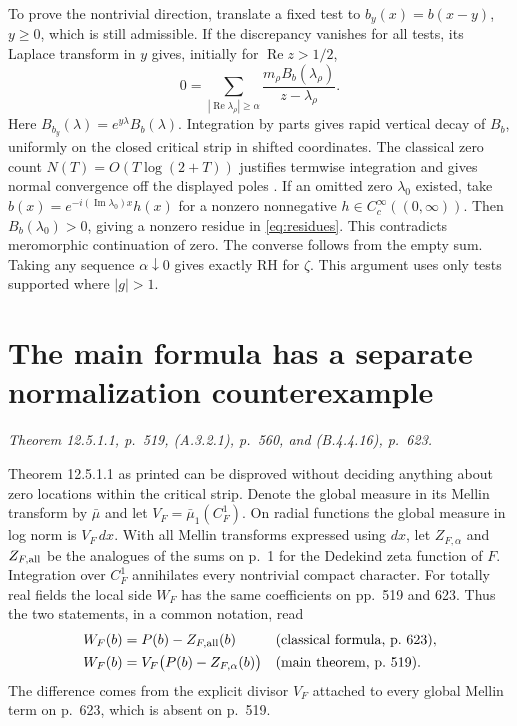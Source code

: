 \documentclass[11pt,letterpaper]{article}
\newcommand{\Rea}{\operatorname{Re}}
\newcommand{\Ima}{\operatorname{Im}}
\newcommand{\source}[1]{{\small\itshape #1}\par}
\newcommand{\pagepart}[2]{\clearpage\section{#1}\label{#2}}
\begin{document}
To prove the nontrivial direction, translate a fixed test to \(b_y(x)=b(x-y)\), \(y\ge0\), which is still admissible. If the discrepancy vanishes for all tests, its Laplace transform in \(y\) gives, initially for \(\Rea z>1/2\),
\begin{equation}
        0=\sum_{|\Rea\lambda_\rho|\ge\alpha}
                 \frac{m_\rho B_b(\lambda_\rho)}{z-\lambda_\rho}.
        \label{eq:residues}
\end{equation}
Here \(B_{b_y}(\lambda)=e^{y\lambda}B_b(\lambda)\). Integration by parts gives rapid vertical decay of \(B_b\), uniformly on the closed critical strip in shifted coordinates. The classical zero count \(N(T)=O(T\log(2+T))\) justifies termwise integration and gives normal convergence off the displayed poles \cite{bombieri}. If an omitted zero \(\lambda_0\) existed, take \(b(x)=e^{-i(\Ima\lambda_0)x}h(x)\) for a nonzero nonnegative \(h\in C_c^\infty((0,\infty))\). Then \(B_b(\lambda_0)>0\), giving a nonzero residue in \eqref{eq:residues}. This contradicts meromorphic continuation of zero. The converse follows from the empty sum. Taking any sequence \(\alpha\downarrow0\) gives exactly RH for \(\zeta\). This argument uses only tests supported where \(|g|>1\).

\pagepart{The main formula has a separate normalization counterexample}{sec:volume}
\source{Theorem 12.5.1.1, p.~519, (A.3.2.1), p.~560, and (B.4.4.16), p.~623.}

Theorem 12.5.1.1 as printed can be disproved without deciding anything about zero locations within the critical strip. Denote the global measure in its Mellin transform by \(\bar\mu\) and let \(V_F=\bar\mu_1(C_F^1)\). On radial functions the global measure in log norm is \(V_F\,dx\). With all Mellin transforms expressed using \(dx\), let \(Z_{F,\alpha}\) and \(Z_{F,\rm all}\) be the analogues of the sums on p.~1 for the Dedekind zeta function of \(F\). Integration over \(C_F^1\) annihilates every nontrivial compact character. For totally real fields the local side \(W_F\) has the same coefficients on pp.~519 and 623. Thus the two statements, in a common notation, read
\begin{align}
 W_F(b)&=P(b)-Z_{F,\rm all}(b)
      &&\text{(classical formula, p.~623)},\label{eq:fullfield}\\
 W_F(b)&=V_F\bigl(P(b)-Z_{F,\alpha}(b)\bigr)
      &&\text{(main theorem, p.~519)}.\label{eq:claimedfield}
\end{align}
The difference comes from the explicit divisor \(V_F\) attached to every global Mellin term on p.~623, which is absent on p.~519.
\end{document}
